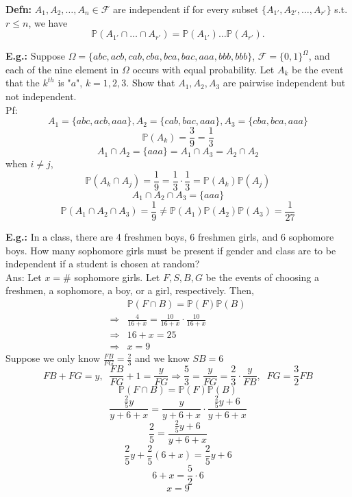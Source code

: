 \documentclass[a4paper]{article}
\newcommand{\n}{\hfill\break}
\newcommand{\defn}[1]{\par\noindent\settowidth{\hangindent}{\textbf{Defn: }}\textbf{Defn: }#1\n}
\newcommand{\eg}[1]{\par\noindent\settowidth{\hangindent}{\textbf{E.g.: }}\textbf{E.g.: }#1\n}
\newcommand{\F}{\mathcal F}
\newcommand{\Prob}{\mathbb{P}}
\renewcommand{\P}{\Prob}
\begin{document}
\defn{$A_1, A_2, \dots, A_n\in\F$ are independent if for every subset $\{A_{1'}, A_{2'},\dots, A_{r'}\}$ s.t. $r\leq n$, we have \[\P(A_{1'}\cap\dots\cap A_{r'})=\P(A_{1'})\dots\P(A_{r'}).\]
}

\eg{Suppose $\Omega=\{abc, acb, cab, cba, bca, bac, aaa, bbb, bbb\}$, $\F=\{0, 1\}^\Omega$, and each of the nine element in $\Omega$ occurs with equal probability. Let $A_k$ be the event that the $k^{th}$ is "$a$", $k=1, 2, 3$. Show that $A_1, A_2, A_3$ are pairwise independent but not independent. \\
Pf:\[A_1=\{abc, acb, aaa\}, A_2=\{cab, bac, aaa\}, A_3=\{cba, bca, aaa\}\]
\[\P(A_k)=\frac{3}{9}=\frac{1}{3}\]
\[A_1\cap A_2=\{aaa\}=A_1\cap A_3=A_2\cap A_2\]
when $i\neq j$,
\[\P(A_k\cap A_j)=\frac{1}{9}=\frac{1}{3}\cdot\frac{1}{3}=\P(A_k)\P(A_j)\]
\[A_1\cap A_2\cap A_3=\{aaa\}\]
\[\P(A_1\cap A_2\cap A_3)=\frac{1}{9}\neq\P(A_1)\P(A_2)\P(A_3)=\frac{1}{27}\]
}

\eg{In a class, there are 4 freshmen boys, 6 freshmen girls, and 6 sophomore boys. How many sophomore girls must be present if gender and class are to be independent if a student is chosen at random? \\
Ans: Let $x=\#$ sophomore girls. Let $F, S, B, G$ be the events of choosing a freshmen, a sophomore, a boy, or a girl, respectively. Then, 
\begin{align*}
    & \P(F\cap B)=\P(F)\P(B) \\
    \Rightarrow& \frac{4}{16+x}=\frac{10}{16+x}\cdot\frac{10}{16+x} \\
    \Rightarrow& 16+x=25 \\
    \Rightarrow& x=9
\end{align*}
Suppose we only know $\frac{FB}{FG}=\frac{2}{3}$ and we know $SB=6$
\[FB+FG=y,\;\;\frac{FB}{FG}+1=\frac{y}{FG} \Rightarrow \frac{5}{3}=\frac{y}{FG}=\frac{2}{3}\cdot\frac{y}{FB},\;\;FG=\frac{3}{2}FB\]
\[\P(F\cap B)=\P(F)\P(B)\]
\[\frac{\frac{2}{5}y}{y+6+x}=\frac{y}{y+6+x}\cdot\frac{\frac{2}{5}y+6}{y+6+x}\]
\[\frac{2}{5}=\frac{\frac{2}{5}y+6}{y+6+x}\]
\[\frac{2}{5}y+\frac{2}{5}(6+x)=\frac{2}{5}y+6\]
\[6+x=\frac{5}{2}\cdot 6\]
\[x=9\]


}
\end{document}
